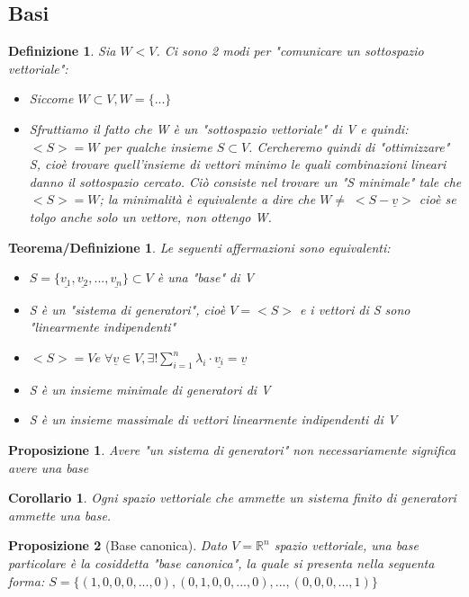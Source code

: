 \documentclass[12pt]{article}
\newenvironment{para}{\begin{adjustwidth}{13mm}{}}{\end{adjustwidth}}
\newtheorem{Definizione}{Definizione}[subsection]
\newtheorem{Teorema/Definizione}{Teorema/Definizione}[subsection]
\newtheorem{Corollario}{Corollario}[subsection]
\newtheorem{Proposizione}{Proposizione}[subsection]
\begin{document}
\begin{para}
\section{Basi}
\begin{Definizione}
Sia $W < V$. Ci sono 2 modi per "comunicare un sottospazio vettoriale":
\begin{itemize}
    \item Siccome $W \subset V, W = \{...\}$
    \item Sfruttiamo il fatto che W è un "sottospazio vettoriale" di V e quindi: \newline $<S> = W$ per qualche insieme $S \subset V$. Cercheremo quindi di "ottimizzare" S, cioè trovare quell'insieme di vettori minimo le quali combinazioni lineari danno il sottospazio cercato. Ciò consiste nel trovare un "S minimale" tale che $<S> = W$; la minimalità è equivalente a dire che $W \neq \; <S-\underline{v}>$ cioè se tolgo anche solo un vettore, non ottengo W.
\end{itemize}
\end{Definizione}
\begin{Teorema/Definizione}
Le seguenti affermazioni sono equivalenti:
\begin{itemize}
    \item $S = \{\underline{v_1}, \underline{v_2}, ..., \underline{v_n} \} \subset V$ è una "base" di V
    \item S è un "sistema di generatori", cioè $V = <S>$ e i vettori di S sono "linearmente indipendenti"
    \item $<S> = V e \; \forall\underline{v}\in V, \exists! \sum_{i = 1}^{n} \lambda_i \cdot \underline{v_i} = \underline{v}$
    \item S è un insieme minimale di generatori di V
    \item S è un insieme massimale di vettori linearmente indipendenti di V
\end{itemize}
\end{Teorema/Definizione}
\begin{Proposizione}
    Avere "un sistema di generatori" non necessariamente significa avere una base
\end{Proposizione}
\begin{Corollario}
Ogni spazio vettoriale che ammette un sistema finito di generatori ammette una base.
\end{Corollario}

\begin{Proposizione}[Base canonica]
Dato $V = \mathbb{R}^n$ spazio vettoriale, una base particolare è la cosiddetta "base canonica", la quale si presenta nella seguenta forma: $S = \{(1,0,0,0,...,0),(0,1,0,0,...,0), ..., (0,0,0,...,1)\}$
\end{Proposizione}


\end{para}
\end{document}

